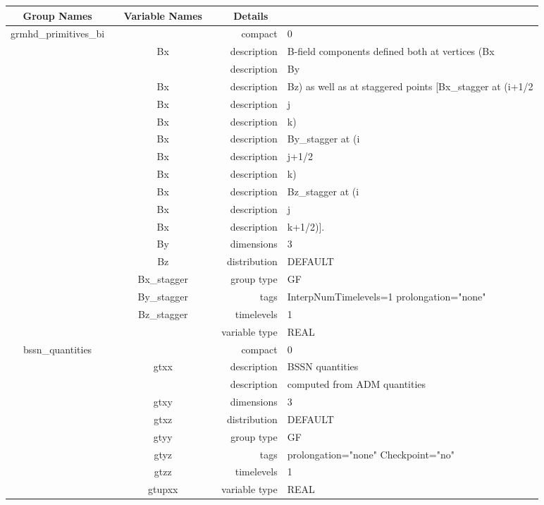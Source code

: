 \begin{tabular*}{150mm}{|c|c@{\extracolsep{\fill}}|rl|} \hline 
~ {\bf Group Names} ~ & ~ {\bf Variable Names} ~  &{\bf Details} ~ & ~ \\ 
\hline 
grmhd\_primitives\_bi &  & compact & 0 \\ 
 & Bx & description & B-field components defined both at vertices (Bx \\ 
& ~ & description & By \\ 
 & Bx & description & Bz) as well as at staggered points [Bx\_stagger at (i+1/2 \\ 
 & Bx & description & j \\ 
 & Bx & description & k) \\ 
 & Bx & description & By\_stagger at (i \\ 
 & Bx & description & j+1/2 \\ 
 & Bx & description & k) \\ 
 & Bx & description & Bz\_stagger at (i \\ 
 & Bx & description & j \\ 
 & Bx & description & k+1/2)]. \\ 
 & By & dimensions & 3 \\ 
 & Bz & distribution & DEFAULT \\ 
 & Bx\_stagger & group type & GF \\ 
 & By\_stagger & tags & InterpNumTimelevels=1 prolongation="none" \\ 
 & Bz\_stagger & timelevels & 1 \\ 
 &  & variable type & REAL \\ 
\hline 
bssn\_quantities &  & compact & 0 \\ 
 & gtxx & description & BSSN quantities \\ 
& ~ & description &  computed from ADM quantities \\ 
 & gtxy & dimensions & 3 \\ 
 & gtxz & distribution & DEFAULT \\ 
 & gtyy & group type & GF \\ 
 & gtyz & tags & prolongation="none" Checkpoint="no" \\ 
 & gtzz & timelevels & 1 \\ 
 & gtupxx & variable type & REAL \\ 
\hline 
\end{tabular*} 



\vspace{5mm}

